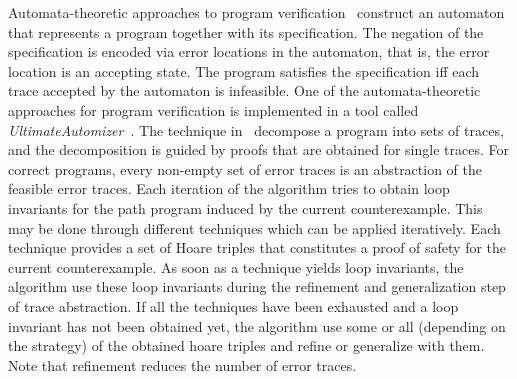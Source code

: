%
%
Automata-theoretic approaches to program verification~\cite{DBLP:conf/cav/KupfermanV00,
DBLP:books/sp/cstoday95/Vardi95,DBLP:conf/cav/HeizmannHP13} construct 
an automaton that represents a program together with its specification.
The negation of the specification is encoded via error locations in the automaton, 
that is, the error location is an accepting state.  The program satisfies the 
specification iff each trace accepted by the automaton is infeasible.
%
One of the automata-theoretic approaches for program verification 
is implemented in a tool called 
\emph{UltimateAutomizer}~\cite{DBLP:conf/tacas/HeizmannDGLMSP16}. 
The technique in~\cite{DBLP:conf/tacas/HeizmannDGLMSP16} decompose a 
program into sets of traces, and the decomposition is guided by proofs that 
are obtained for single traces. For correct programs, every non-empty set 
of error traces is an abstraction of the feasible error traces.  
Each iteration of the algorithm tries to obtain loop invariants for the path program
induced by the current counterexample.  This may be done through different techniques 
which can be applied iteratively. Each technique provides a set of Hoare triples that constitutes a proof of
safety for the current counterexample.
As soon as a technique yields loop invariants, the algorithm use these loop
invariants during the refinement and generalization step of trace abstraction.  If all the 
techniques have been exhausted and a loop invariant has not been obtained yet, the algorithm
use some or all (depending on the strategy) of the obtained hoare triples and 
refine or generalize with them.  Note that refinement reduces the number of error traces. 
